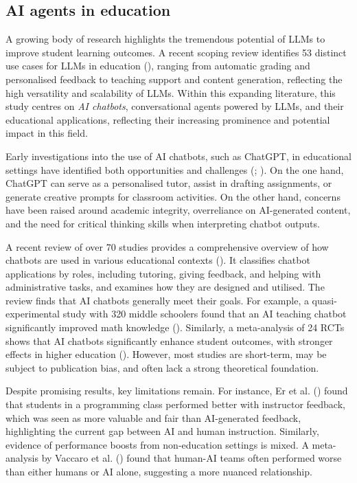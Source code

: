 \documentclass[
  11pt,
]{article}
\begin{document}
\subsection{AI agents in education}\label{ai-agents-in-education}

A growing body of research highlights the tremendous potential of LLMs to improve student learning outcomes. A recent scoping review identifies 53 distinct use cases for LLMs in education (), ranging from automatic grading and personalised feedback to teaching support and content generation, reflecting the high versatility and scalability of LLMs. Within this expanding literature, this study centres on \emph{AI chatbots}, conversational agents powered by LLMs, and their educational applications, reflecting their increasing prominence and potential impact in this field.

Early investigations into the use of AI chatbots, such as ChatGPT, in educational settings have identified both opportunities and challenges (; ). On the one hand, ChatGPT can serve as a personalised tutor, assist in drafting assignments, or generate creative prompts for classroom activities. On the other hand, concerns have been raised around academic integrity, overreliance on AI-generated content, and the need for critical thinking skills when interpreting chatbot outputs.

A recent review of over 70 studies provides a comprehensive overview of how chatbots are used in various educational contexts (). It classifies chatbot applications by roles, including tutoring, giving feedback, and helping with administrative tasks, and examines how they are designed and utilised. The review finds that AI chatbots generally meet their goals. For example, a quasi-experimental study with 320 middle schoolers found that an AI teaching chatbot significantly improved math knowledge (). Similarly, a meta-analysis of 24 RCTs shows that AI chatbots significantly enhance student outcomes, with stronger effects in higher education (). However, most studies are short-term, may be subject to publication bias, and often lack a strong theoretical foundation.

Despite promising results, key limitations remain. For instance, Er et al. () found that students in a programming class performed better with instructor feedback, which was seen as more valuable and fair than AI-generated feedback, highlighting the current gap between AI and human instruction. Similarly, evidence of performance boosts from non-education settings is mixed. A meta-analysis by Vaccaro et al. () found that human-AI teams often performed worse than either humans or AI alone, suggesting a more nuanced relationship.
\end{document}
